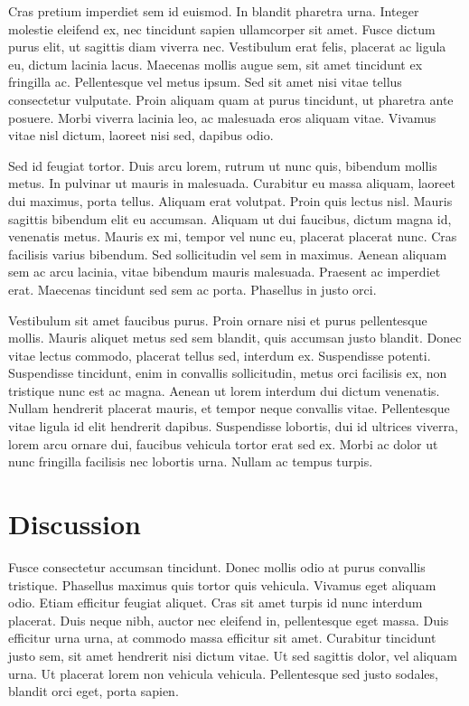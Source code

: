 \documentclass{article}
\begin{document}
Cras pretium imperdiet sem id euismod. In blandit pharetra urna. Integer
molestie eleifend ex, nec tincidunt sapien ullamcorper sit amet. Fusce
dictum purus elit, ut sagittis diam viverra nec. Vestibulum erat felis,
placerat ac ligula eu, dictum lacinia lacus. Maecenas mollis augue sem,
sit amet tincidunt ex fringilla ac. Pellentesque vel metus ipsum. Sed
sit amet nisi vitae tellus consectetur vulputate. Proin aliquam quam at
purus tincidunt, ut pharetra ante posuere. Morbi viverra lacinia leo, ac
malesuada eros aliquam vitae. Vivamus vitae nisl dictum, laoreet nisi
sed, dapibus odio.

Sed id feugiat tortor. Duis arcu lorem, rutrum ut nunc quis, bibendum
mollis metus. In pulvinar ut mauris in malesuada. Curabitur eu massa
aliquam, laoreet dui maximus, porta tellus. Aliquam erat volutpat. Proin
quis lectus nisl. Mauris sagittis bibendum elit eu accumsan. Aliquam ut
dui faucibus, dictum magna id, venenatis metus. Mauris ex mi, tempor vel
nunc eu, placerat placerat nunc. Cras facilisis varius bibendum. Sed
sollicitudin vel sem in maximus. Aenean aliquam sem ac arcu lacinia,
vitae bibendum mauris malesuada. Praesent ac imperdiet erat. Maecenas
tincidunt sed sem ac porta. Phasellus in justo orci.

Vestibulum sit amet faucibus purus. Proin ornare nisi et purus
pellentesque mollis. Mauris aliquet metus sed sem blandit, quis accumsan
justo blandit. Donec vitae lectus commodo, placerat tellus sed, interdum
ex. Suspendisse potenti. Suspendisse tincidunt, enim in convallis
sollicitudin, metus orci facilisis ex, non tristique nunc est ac magna.
Aenean ut lorem interdum dui dictum venenatis. Nullam hendrerit placerat
mauris, et tempor neque convallis vitae. Pellentesque vitae ligula id
elit hendrerit dapibus. Suspendisse lobortis, dui id ultrices viverra,
lorem arcu ornare dui, faucibus vehicula tortor erat sed ex. Morbi ac
dolor ut nunc fringilla facilisis nec lobortis urna. Nullam ac tempus
turpis.

\hypertarget{discussion}{%
\section{Discussion}\label{discussion}}

Fusce consectetur accumsan tincidunt. Donec mollis odio at purus
convallis tristique. Phasellus maximus quis tortor quis vehicula.
Vivamus eget aliquam odio. Etiam efficitur feugiat aliquet. Cras sit
amet turpis id nunc interdum placerat. Duis neque nibh, auctor nec
eleifend in, pellentesque eget massa. Duis efficitur urna urna, at
commodo massa efficitur sit amet. Curabitur tincidunt justo sem, sit
amet hendrerit nisi dictum vitae. Ut sed sagittis dolor, vel aliquam
urna. Ut placerat lorem non vehicula vehicula. Pellentesque sed justo
sodales, blandit orci eget, porta sapien.
\end{document}
